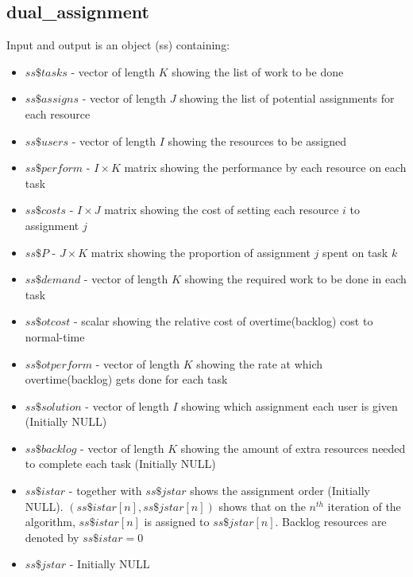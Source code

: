 \documentclass[12pt]{article}
\begin{document}
\subsection{dual\_assignment}
Input and output is an object (ss) containing:
\begin{itemize}
\item $ss\$tasks$ - vector of length $K$ showing the list of work to be done
\item $ss\$assigns$ - vector of length $J$ showing the list of potential assignments for each resource
\item $ss\$users$ - vector of length $I$ showing the resources to be assigned
\item $ss\$perform$ - $I \times K$ matrix showing the performance by each resource on each task
\item $ss\$costs$ - $I \times J$ matrix showing the cost of setting each resource $i$ to assignment $j$
\item $ss\$P$ - $J \times K$ matrix showing the proportion of assignment $j$ spent on task $k$
\item $ss\$demand$ - vector of length $K$ showing the required work to be done in each task
\item $ss\$otcost$ - scalar showing the relative cost of overtime(backlog) cost to normal-time
\item $ss\$otperform$ - vector of length $K$ showing the rate at which overtime(backlog) gets done for each task
\item $ss\$solution$ - vector of length $I$ showing which assignment each user is given (Initially NULL)
\item $ss\$backlog$ - vector of length $K$ showing the amount of extra resources needed to complete each task (Initially NULL)
\item $ss\$istar$ - together with $ss\$jstar$ shows the assignment order (Initially NULL). $(ss\$istar[n],ss\$jstar[n])$ shows that on the $n^{th}$ iteration of the algorithm, $ss\$istar[n]$ is assigned to $ss\$jstar[n]$. Backlog resources are denoted by $ss\$istar=0$
\item $ss\$jstar$ - Initially NULL
\end{itemize}
\end{document}
